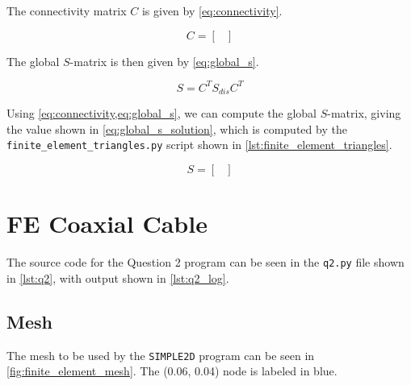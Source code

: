 \documentclass[a4paper,titlepage]{article}
\begin{document}
	The connectivity matrix $C$ is given by \cref{eq:connectivity}.

	\begin{equation} \label{eq:connectivity}
		C =
			\begin{bmatrix}
				
			\end{bmatrix}
	\end{equation}
	
	The global $S$-matrix is then given by \cref{eq:global_s}.
	
	\begin{equation} \label{eq:global_s}
		S = C^T S_{dis} C^T
	\end{equation}
	
	Using \cref{eq:connectivity,eq:global_s}, we can compute the global $S$-matrix, giving the value shown in \cref{eq:global_s_solution}, which is computed by the \texttt{finite_element_triangles.py} script shown in \cref{lst:finite_element_triangles}.
	
	\begin{equation} \label{eq:global_s_solution}
		S =
			\begin{bmatrix}
				
			\end{bmatrix}
	\end{equation}
	
	\section{FE Coaxial Cable}
	
	The source code for the Question 2 program can be seen in the \texttt{q2.py} file shown in \cref{lst:q2}, with output shown in \cref{lst:q2_log}.
	
	\subsection{Mesh}
	The mesh to be used by the \texttt{SIMPLE2D} program can be seen in \cref{fig:finite_element_mesh}. The (0.06, 0.04) node is labeled in blue.
	
\end{document}
